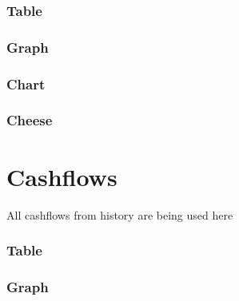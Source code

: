 \documentclass[8pt]{article} %
\begin{document}
\subsubsection{Table}

\subsubsection{Graph}

\subsubsection{Chart}
\subsubsection{Cheese}


\section{Cashflows}


All cashflows from history are being used here\\

\subsubsection{Table}

\subsubsection{Graph}
%
\end{document}
